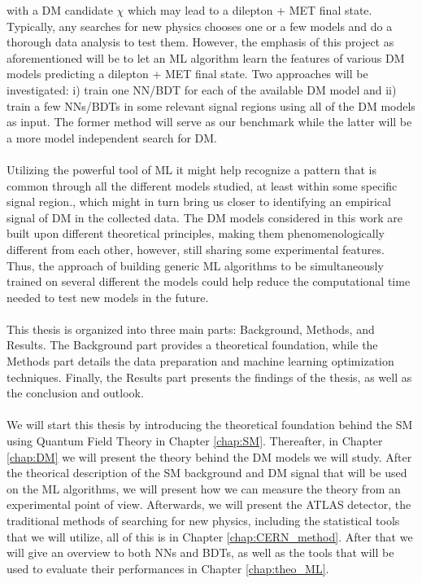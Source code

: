 \documentclass[12pt, a4paper]{book}
\begin{document}
with a DM candidate $\chi$ which may lead to a dilepton + MET final state. Typically, any searches for new physics chooses one or a few models and do a thorough data analysis to test them. However, the emphasis of this project as aforementioned will be to let an ML algorithm 
learn the features of various DM models predicting a dilepton + MET final state.  Two approaches will be investigated: i) train one NN/BDT for each of the available DM model and ii) train a few NNs/BDTs in some relevant signal regions using all of the DM models as input. 
The former method will serve as our benchmark while the latter will be a more model independent search for DM. \\
\\Utilizing the powerful tool of ML it might help recognize a pattern that is common through all the different models studied, at least within some specific signal region., which might in turn bring us closer to identifying an empirical signal of DM in the collected data. 
The DM models considered in this work are built upon different theoretical principles, making them phenomenologically different from each other, however, still sharing some experimental features. Thus, the approach of building generic ML algorithms to be simultaneously trained on several different the models 
could help reduce the computational time needed to test new models in the future.\\
\\This thesis is organized into three main parts: Background, Methods, and Results. The Background part provides a theoretical foundation, while the Methods part details the data preparation and machine learning optimization techniques. 
Finally, the Results part presents the findings of the thesis, as well as the conclusion and outlook.\\
\\We will start this thesis by introducing the theoretical foundation behind the SM using Quantum Field Theory in Chapter \ref{chap:SM}. Thereafter, in Chapter \ref{chap:DM} we will present the theory behind the DM models we will study. After the theorical description of the SM background and DM 
signal that will be used on the ML algorithms, we will present how we can measure the theory from an experimental point of view. Afterwards, we will present the ATLAS detector, the traditional methods of searching for new physics, including the statistical 
tools that we will utilize, all of this is in Chapter \ref{chap:CERN_method}. After that we will give an overview to both NNs and BDTs, as well as the tools that will be used to evaluate their performances in Chapter \ref{chap:theo_ML}.\\
\end{document}
